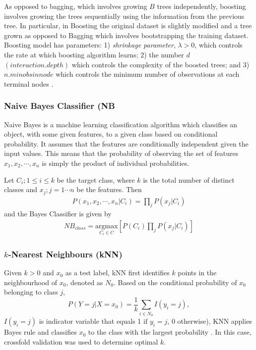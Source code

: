 As opposed to bagging, which involves growing $B$ trees independently, boosting involves growing the trees sequentially using the information from the previous tree. In particular, in Boosting the original dataset is slightly modified and a tree grown as opposed to Bagging which involves bootstrapping the training dataset. Boosting model has parameters: 1) \textit{shrinkage parameter}, $\lambda>0$, which controls the rate at which boosting algorithm learns; 2) the number $d$ $(interaction.depth)$ which controls the complexity of the boosted trees; and 3) $n.minobsinnode$ which controls the minimum number of observations at each terminal nodes \citep{james2013introduction}.

\subsubsection{Naive Bayes Classifier (NB}

Naive Bayes is a machine learning classification algorithm which classifies an object, with some given features, to a given class based on conditional probability. It assumes that the features are conditionally independent given the input values. This means that the probability of observing the set of features $x_1, x_2, \cdots, x_n$ is simply the product of individual probabilities.

\noindent Let $C_i; 1\leq i \leq k$ be the target class, where $k$ is the total number of distinct classes and $x_j; j=1\cdots n$ be the features. Then 
\begin{align*}
P(x_1, x_2, \cdots, x_n|C_i) = \prod_j{P(x_j|C_i)}
\end{align*}
and the Bayes Classifier is given by
\begin{align}
NB_{class} =  \underset{C_i\in C}{\mathrm{argmax }}\left[ P(C_i) \prod_j{P(x_j|C_i)}\right] \label{eqn1}
\end{align}


\subsubsection{$k$-Nearest Neighbours (kNN)}

Given $k>0$ and $x_0$ as a test label, kNN first identifies $k$ points in the neighbourhood of $x_0$, denoted as $\mathit{N}_0$. Based on the conditional probability of $x_0$ belonging to class $j$, 
\[
P(Y = j|X = x_0) = \frac{1}{k}\sum_{i\in \mathit{N}_0}I(y_i=j),
\]
$I(y_i=j)$ is indicator variable that equals 1 if $y_i=j$, 0 otherwise), KNN applies Bayes rule and classifies $x_0$ to the class with the largest probability \citep{trevor2009elements}. In this case, crossfold validation was used to determine optimal $k$.


